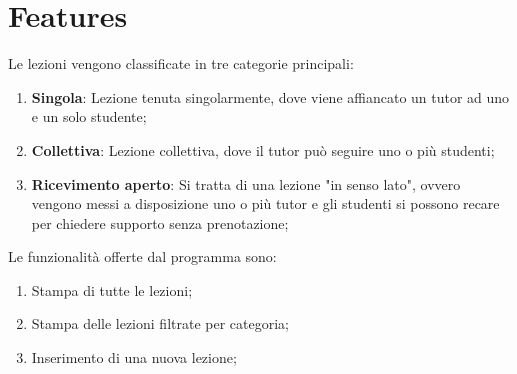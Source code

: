 \section{Features}
Le lezioni vengono classificate in tre categorie principali:
\begin{enumerate}
	\item \textbf{Singola}: Lezione tenuta singolarmente, dove viene affiancato un tutor ad uno e un solo studente;
	\item \textbf{Collettiva}: Lezione collettiva, dove il tutor può seguire uno o più studenti;
	\item \textbf{Ricevimento aperto}: Si tratta di una lezione "in senso lato", ovvero vengono messi a disposizione uno o più tutor e gli studenti si possono recare per chiedere supporto senza prenotazione;
\end{enumerate}
Le funzionalità offerte dal programma sono:
\begin{enumerate}
	\item Stampa di tutte le lezioni;
	\item Stampa delle lezioni filtrate per categoria;
	\item Inserimento di una nuova lezione;
\end{enumerate}

